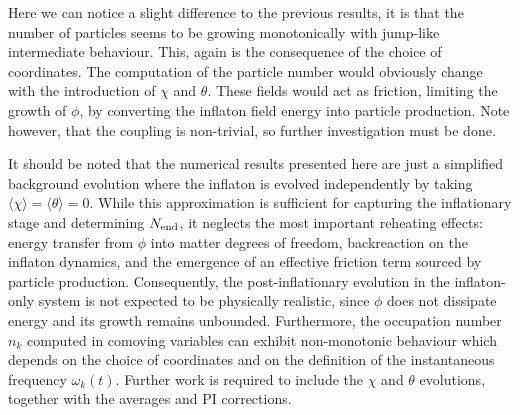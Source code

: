 Here we can notice a slight difference to the previous results, it is that the number of particles seems to be growing monotonically with jump-like intermediate behaviour. This, again is the consequence of the choice of coordinates. The computation of the particle number would obviously change with the introduction of $\chi$ and $\theta$. These fields would act as friction, limiting the growth of $\phi$, by converting the inflaton field energy into particle production. Note however, that the coupling is non-trivial, so further investigation must be done.

It should be noted that the numerical results presented here are just a simplified background evolution where the inflaton is evolved independently by taking $\langle \chi \rangle=\langle \theta \rangle=0$. While this approximation is sufficient for capturing the inflationary stage and determining $N_{\rm end}$, it neglects the most important reheating effects: energy transfer from $\phi$ into matter degrees of freedom, backreaction on the inflaton dynamics, and the emergence of an effective friction term sourced by particle production. Consequently, the post-inflationary evolution in the inflaton-only system is not expected to be physically realistic, since $\phi$ does not dissipate energy and its growth remains unbounded. Furthermore, the occupation number $n_k$ computed in comoving variables can exhibit non-monotonic behaviour which depends on the choice of coordinates and on the definition of the instantaneous frequency $\omega_k(t)$. Further work is required to include the $\chi$ and $\theta$ evolutions, together with the averages and PI corrections.